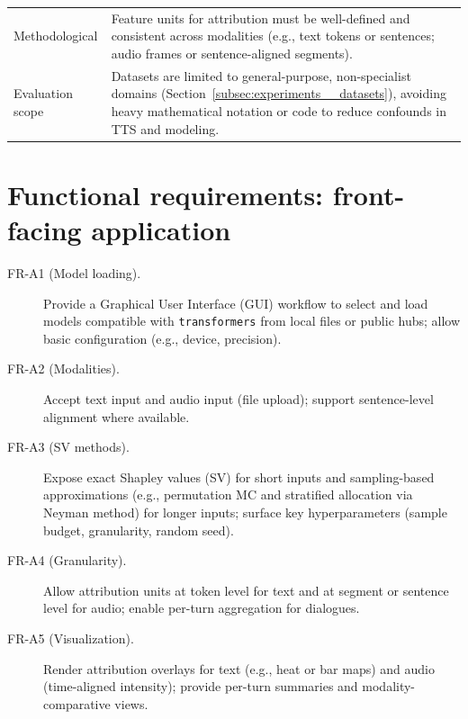 \begin{appendices}
\begin{table}[htbp]
\begin{tabular}{p{2.5cm} p{11.5cm}}
    Methodological & Feature units for attribution must be well-defined and consistent across modalities (e.g., text tokens or sentences; audio frames or sentence-aligned segments). \\

    Evaluation scope & Datasets are limited to general-purpose, non-specialist domains (Section~\ref{subsec:experiments__datasets}), avoiding heavy mathematical notation or code to reduce confounds in TTS and modeling. \\

    \bottomrule

    \end{tabular}
    \label{tab:requirements__constraints__tab}
    \end{table}

    \section{Functional requirements: front-facing application}
    \label{subsec:requirements__app}

    \begin{description}

    \item[FR-A1 (Model loading).] Provide a Graphical User Interface (GUI) workflow to select and load models compatible with \texttt{transformers} from local files or public hubs; allow basic configuration (e.g., device, precision).

    \item[FR-A2 (Modalities).] Accept text input and audio input (file upload); support sentence-level alignment where available.

    \item[FR-A3 (SV methods).] Expose exact Shapley values (SV) for short inputs and sampling-based approximations (e.g., permutation MC and stratified allocation via Neyman method) for longer inputs; surface key hyperparameters (sample budget, granularity, random seed).

    \item[FR-A4 (Granularity).] Allow attribution units at token level for text and at segment or sentence level for audio; enable per-turn aggregation for dialogues.

    \item[FR-A5 (Visualization).] Render attribution overlays for text (e.g., heat or bar maps) and audio (time-aligned intensity); provide per-turn summaries and modality-comparative views.


\end{description}
\end{appendices}
